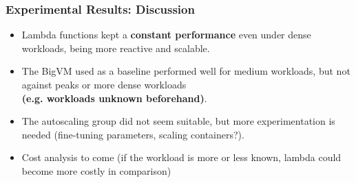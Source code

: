 \documentclass[pdf,10pt]{beamer}
\begin{document}
\begin{frame}\frametitle{Experimental Results: Discussion}


\begin{itemize}
\item Lambda functions kept a \textbf{constant performance} even under dense workloads, being more reactive and scalable.
\item The BigVM used as a baseline performed well for medium workloads, but not against peaks or more dense workloads \\ \textbf{(e.g. workloads unknown beforehand)}.

\item The autoscaling group did not seem suitable, but more experimentation is needed (fine-tuning parameters, scaling containers?).
\item Cost analysis to come (if the workload is more or less known, lambda could become more costly in comparison)
\end{itemize}
\end{frame}




\end{document}
